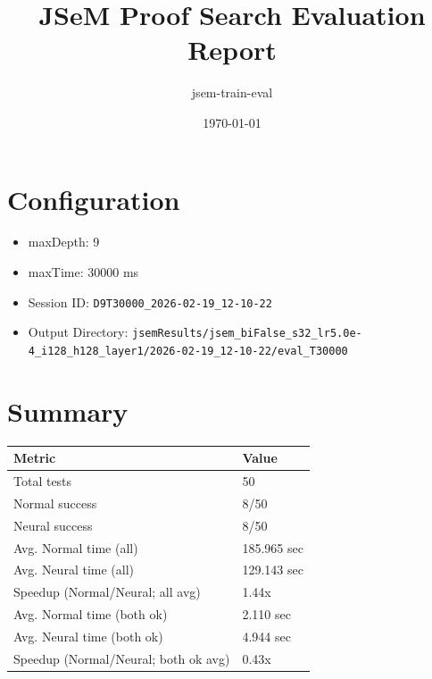 \documentclass[a4paper,10pt]{article}
\title{JSeM Proof Search Evaluation Report}
\author{jsem-train-eval}
\date{\today}
\begin{document}
\maketitle

\section{Configuration}
\begin{itemize}
\item maxDepth: 9
\item maxTime: 30000 ms
\item Session ID: \texttt{D9T30000\_2026-02-19\_12-10-22}
\item Output Directory: \texttt{jsemResults/jsem\_biFalse\_s32\_lr5.0e-4\_i128\_h128\_layer1/2026-02-19\_12-10-22/eval\_T30000}
\end{itemize}

\section{Summary}
\begin{tabular}{ll}
\toprule
\textbf{Metric} & \textbf{Value} \\
\midrule
Total tests & 50 \\
Normal success & 8/50 \\
Neural success & 8/50 \\
\midrule
Avg. Normal time (all) & 185.965 sec \\
Avg. Neural time (all) & 129.143 sec \\
Speedup (Normal/Neural; all avg) & 1.44x \\
Avg. Normal time (both ok) & 2.110 sec \\
Avg. Neural time (both ok) & 4.944 sec \\
Speedup (Normal/Neural; both ok avg) & 0.43x \\
\bottomrule
\end{tabular}
\end{document}
